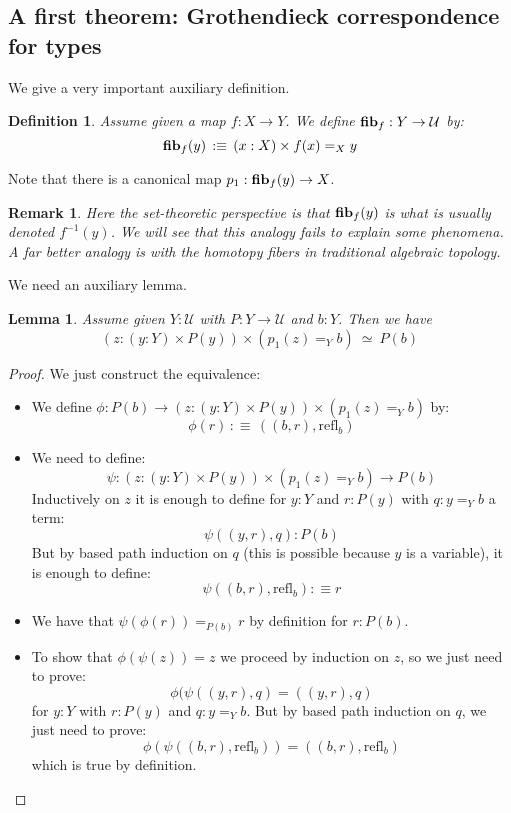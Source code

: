 \documentclass{article}
\newcommand{\sse}[1]{\medbreak \subsection{#1}}
\newcommand{\U}{{\mathcal U}}
\renewcommand{\r}{\rightarrow}
\newcommand{\refl}{\mathrm{refl}}
\newcommand{\fib}{\mathrm{\bf fib}}
\newtheorem{lemma}{Lemma}
\newtheorem{definition}{Definition}
\newtheorem{remark}{Remark}
\begin{document}
\sse{A first theorem: Grothendieck correspondence for types}

We give a very important auxiliary definition.

\begin{definition}
Assume given a map $f:X\r Y$. We define $\fib_f : Y\r \U$ by:
\[\fib_f(y) \, :\equiv \, (x:X)\times f(x) =_X y\]
\end{definition}

Note that there is a canonical map $p_1:\fib_f(y) \r X$.

\begin{remark}
Here the set-theoretic perspective is that $\fib_f(y)$ is what is usually denoted $f^{-1}(y)$. We will see that this analogy fails to explain some phenomena. A far better analogy is with the \emph{homotopy fibers} in traditional algebraic topology. %
\end{remark}


We need an auxiliary lemma.

\begin{lemma}
Assume given $Y:\U$ with $P:Y\r \U$ and $b:Y$. Then we have
\[(z:(y:Y)\times P(y))\times (p_1(z) =_Y b) \ \simeq \ P(b)\]
\end{lemma}
\begin{proof}
We just construct the equivalence:
\begin{itemize}
\item We define $\phi : P(b) \r (z:(y:Y)\times P(y))\times (p_1(z) =_Y b)$ by:
\[\phi(r) \, :\equiv\, ((b,r),\refl_b)\]
\item We need to define: 
\[\psi : (z:(y:Y)\times P(y))\times (p_1(z) =_Y b) \r P(b)\] 
Inductively on $z$ it is enough to define for $y:Y$ and $r:P(y)$ with $q:y=_Y b$ a term:
\[\psi((y,r),q) : P(b)\]
But by based path induction on $q$ (this is possible because $y$ is a variable), it is enough to define:
\[\psi((b,r),\refl_b) :\equiv r\]
\item We have that $\psi(\phi(r)) =_{P(b)} r$ by definition for $r:P(b)$.
\item To show that $\phi(\psi(z)) = z$ we proceed by induction on $z$, so we just need to prove:
\[\phi(\psi((y,r),q) = ((y,r),q)\]
for $y:Y$ with $r:P(y)$ and $q:y=_Y b$. But by based path induction on $q$, we just need to prove:
\[\phi(\psi((b,r),\refl_b)) = ((b,r),\refl_b)\]
which is true by definition.
\end{itemize}
\end{proof}
\end{document}
